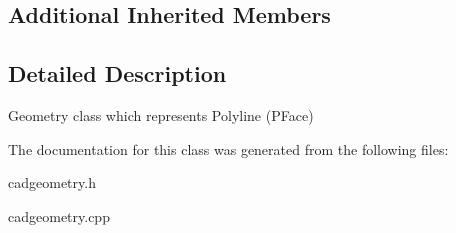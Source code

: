 \subsection*{Additional Inherited Members}


\subsection{Detailed Description}
Geometry class which represents Polyline (P\+Face) 

The documentation for this class was generated from the following files\+:\begin{DoxyCompactItemize}
\item 
cadgeometry.\+h\item 
cadgeometry.\+cpp\end{DoxyCompactItemize}
